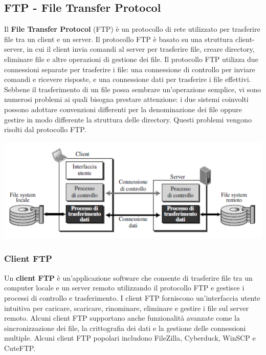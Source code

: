 \documentclass[12pt]{report}
\begin{document}
	\subsection{FTP - File Transfer Protocol}
	Il \textbf{File Transfer Protocol} (FTP) è un protocollo di rete utilizzato per trasferire file tra un client e un server. Il protocollo FTP è basato su una struttura client-server, in cui il client invia comandi al server per trasferire file, creare directory, eliminare file e altre operazioni di gestione dei file. Il protocollo FTP utilizza due connessioni separate per trasferire i file: una connessione di controllo per inviare comandi e ricevere risposte, e una connessione dati per trasferire i file effettivi. Sebbene il trasferimento di un file possa sembrare un'operazione semplice, vi sono numerosi problemi ai quali bisogna prestare attenzione: i due sistemi coinvolti possono adottare convenzioni differenti per la denominazione dei file oppure gestire in modo differente la struttura delle directory. Questi problemi vengono risolti dal protocollo FTP.

	\begin{center}
		\includegraphics[scale=0.5]{assets/ftp.png}
	\end{center}

	\subsubsection{Client FTP}
	Un \textbf{client FTP} è un'applicazione software che consente di trasferire file tra un computer locale e un server remoto utilizzando il protocollo FTP e gestisce i processi di controllo e trasferimento. I client FTP forniscono un'interfaccia utente intuitiva per caricare, scaricare, rinominare, eliminare e gestire i file sul server remoto. Alcuni client FTP supportano anche funzionalità avanzate come la sincronizzazione dei file, la crittografia dei dati e la gestione delle connessioni multiple. Alcuni client FTP popolari includono FileZilla, Cyberduck, WinSCP e CuteFTP.
\end{document}

